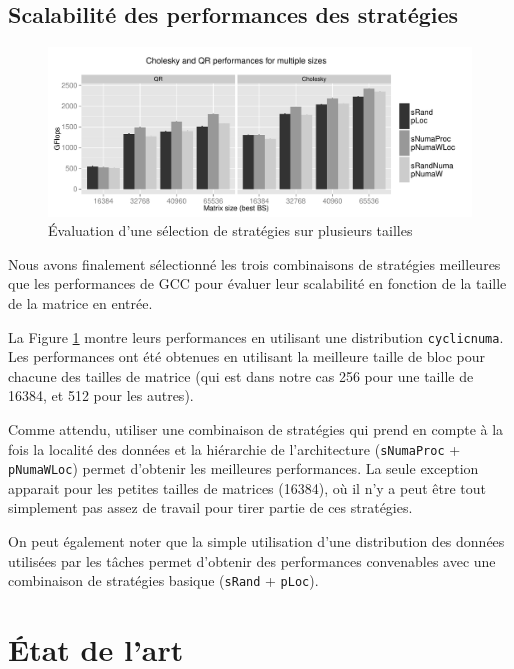 \documentclass[parallelisme]{compas2016}
\begin{document}
\subsection{Scalabilité des performances des stratégies}

\begin{figure}[t]
  \centering
  \includegraphics[scale=0.5]{figures/graph_details_strat.pdf}
\caption{Évaluation d'une sélection de stratégies sur plusieurs tailles}
\label{fig:eval-strat-sizes}
\end{figure}

Nous avons finalement sélectionné les trois combinaisons de stratégies meilleures
que les performances de GCC pour évaluer leur scalabilité en fonction de la taille
de la matrice en entrée.

La Figure \ref{fig:eval-strat-sizes} montre leurs performances en utilisant une distribution
\verb/cyclicnuma/.
Les performances ont été obtenues en utilisant la meilleure taille de bloc pour
chacune des tailles de matrice (qui est dans notre cas 256 pour une taille de 16384,
et 512 pour les autres).

Comme attendu, utiliser une combinaison de stratégies qui prend en compte à la fois
la localité des données et la hiérarchie de l'architecture (\verb/sNumaProc/ + \verb/pNumaWLoc/)
permet d'obtenir les meilleures performances.
La seule exception apparait pour les petites tailles de matrices (16384), où il
n'y a peut être tout simplement pas assez de travail pour tirer partie de ces stratégies. 

On peut également noter que la simple utilisation d'une distribution des données
utilisées par les tâches permet d'obtenir des performances convenables avec une
combinaison de stratégies basique (\verb/sRand/ + \verb/pLoc/).

\section{État de l'art}
\label{sec:related-work}
\end{document}
